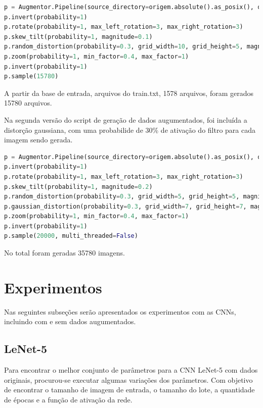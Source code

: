 \documentclass[12pt,
	english,			%
	french,				%
	spanish,			%
	brazil,				%
	]{article}
\begin{document}
\begin{lstlisting}[caption={Código utilizado para augumentar as imagens originais},captionpos=b,frame=single,label={code:augmented1}, language=Python]
p = Augmentor.Pipeline(source_directory=origem.absolute().as_posix(), output_directory=destino.absolute().as_posix())
p.invert(probability=1)
p.rotate(probability=1, max_left_rotation=3, max_right_rotation=3)
p.skew_tilt(probability=1, magnitude=0.1)
p.random_distortion(probability=0.3, grid_width=10, grid_height=5, magnitude=8)
p.zoom(probability=1, min_factor=0.4, max_factor=1)
p.invert(probability=1)
p.sample(15780)
\end{lstlisting}

A partir da base de entrada, arquivos do train.txt, 1578 arquivos, foram gerados 15780 arquivos.

Na segunda versão do script de geração de dados augumentados, foi incluída a distorção gaussiana, com uma probabilide de 30\% de ativação do filtro para cada imagem sendo gerada.

\begin{lstlisting}[caption={Segunda versão do código também aplicado as imagens originais},captionpos=b,frame=single,label={code:augmented2}, language=Python]
p = Augmentor.Pipeline(source_directory=origem.absolute().as_posix(), output_directory=destino.absolute().as_posix())
p.invert(probability=1)
p.rotate(probability=1, max_left_rotation=3, max_right_rotation=3)
p.skew_tilt(probability=1, magnitude=0.2)
p.random_distortion(probability=0.3, grid_width=5, grid_height=5, magnitude=8)
p.gaussian_distortion(probability=0.3, grid_width=7, grid_height=7, magnitude=10, corner='dl', method='out')
p.zoom(probability=1, min_factor=0.4, max_factor=1)
p.invert(probability=1)
p.sample(20000, multi_threaded=False)
\end{lstlisting}

No total foram geradas 35780 imagens.

\section{Experimentos}

Nas seguintes subseções serão apresentados os experimentos com as CNNs, incluindo com e sem dados augumentados.

\subsection{LeNet-5}

Para encontrar o melhor conjunto de parâmetros para a CNN LeNet-5 com dados originais, procurou-se executar algumas variações dos parâmetros. Com objetivo de encontrar o tamanho de imagem de entrada, o tamanho do lote, a quantidade de épocas e a função de ativação da rede.
\end{document}
